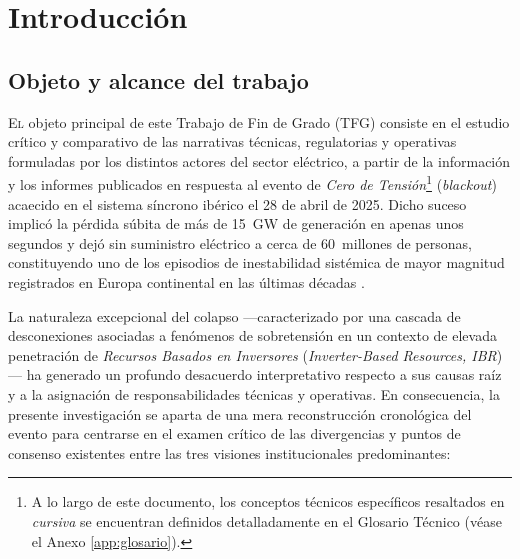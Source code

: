 
\chapter{Introducción}
\label{cap:introduccion}

\section{Objeto y alcance del trabajo}
\label{sec:objeto_alcance}

\lettrine[lines=3, lhang=0.1]{E}{l} objeto principal de este Trabajo de Fin de Grado (TFG) consiste en el estudio crítico y comparativo de las narrativas técnicas, regulatorias y operativas formuladas por los distintos actores del sector eléctrico, a partir de la información y los informes publicados en respuesta al evento de \textit{Cero de Tensión}\footnote{A lo largo de este documento, los conceptos técnicos específicos resaltados en \textit{cursiva} se encuentran definidos detalladamente en el Glosario Técnico (véase el Anexo \ref{app:glosario}).} (\textit{blackout}) acaecido en el sistema síncrono ibérico el 28 de abril de 2025. Dicho suceso implicó la pérdida súbita de más de 15~GW de generación en apenas unos segundos y dejó sin suministro eléctrico a cerca de 60~millones de personas, constituyendo uno de los episodios de inestabilidad sistémica de mayor magnitud registrados en Europa continental en las últimas décadas \cite{entsoe2025, mitceepr2025}.

\medskip

La naturaleza excepcional del colapso ---caracterizado por una cascada de desconexiones asociadas a fenómenos de sobretensión en un contexto de elevada penetración de \textit{Recursos Basados en Inversores} (\textit{Inverter-Based Resources, IBR})--- ha generado un profundo desacuerdo interpretativo respecto a sus causas raíz y a la asignación de responsabilidades técnicas y operativas. En consecuencia, la presente investigación se aparta de una mera reconstrucción cronológica del evento para centrarse en el examen crítico de las divergencias y puntos de consenso existentes entre las tres visiones institucionales predominantes:

